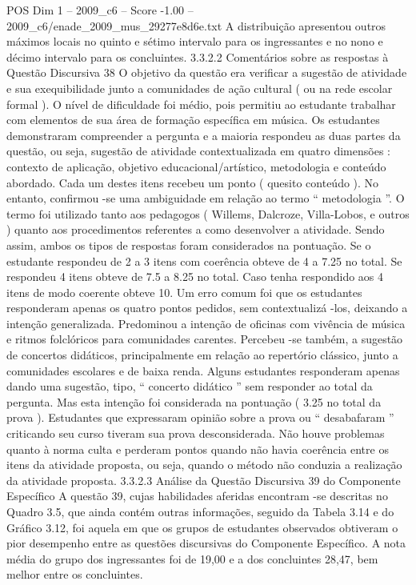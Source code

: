 \begin{textsample}{POS Dim 1 – 2009\_c6 – Score -1.00 – 2009\_c6/enade\_2009\_mus\_29277e8d6e.txt}
A distribuição apresentou outros máximos locais no quinto e sétimo intervalo para os ingressantes e no nono e décimo intervalo para os concluintes. 3.3.2.2 Comentários sobre as respostas à Questão Discursiva 38 O objetivo da questão era verificar a sugestão de atividade e sua exequibilidade junto a comunidades de ação cultural ( ou na rede escolar formal ).
O nível de dificuldade foi médio, pois permitiu ao estudante trabalhar com elementos de sua área de formação específica em música.
Os estudantes demonstraram compreender a pergunta e a maioria respondeu as duas partes da questão, ou seja, sugestão de atividade contextualizada em quatro dimensões : contexto de aplicação, objetivo educacional/artístico, metodologia e conteúdo abordado.
Cada um destes itens recebeu um ponto ( quesito conteúdo ).
No entanto, confirmou -se uma ambiguidade em relação ao termo “ metodologia ”.
O termo foi utilizado tanto aos pedagogos ( Willems, Dalcroze, Villa-Lobos, e outros ) quanto aos procedimentos referentes a como desenvolver a atividade.
Sendo assim, ambos os tipos de respostas foram considerados na pontuação.
Se o estudante respondeu de 2 a 3 itens com coerência obteve de 4 a 7.25 no total.
Se respondeu 4 itens obteve de 7.5 a 8.25 no total.
Caso tenha respondido aos 4 itens de modo coerente obteve 10.
Um erro comum foi que os estudantes responderam apenas os quatro pontos pedidos, sem contextualizá -los, deixando a intenção generalizada.
Predominou a intenção de oficinas com vivência de música e ritmos folclóricos para comunidades carentes.
Percebeu -se também, a sugestão de concertos didáticos, principalmente em relação ao repertório clássico, junto a comunidades escolares e de baixa renda.
Alguns estudantes responderam apenas dando uma sugestão, tipo, “ concerto didático ” sem responder ao total da pergunta.
Mas esta intenção foi considerada na pontuação ( 3.25 no total da prova ).
Estudantes que expressaram opinião sobre a prova ou “ desabafaram ” criticando seu curso tiveram sua prova desconsiderada.
Não houve problemas quanto à norma culta e perderam pontos quando não havia coerência entre os itens da atividade proposta, ou seja, quando o método não conduzia a realização da atividade proposta. 3.3.2.3 Análise da Questão Discursiva 39 do Componente Específico A questão 39, cujas habilidades aferidas encontram -se descritas no Quadro 3.5, que ainda contém outras informações, seguido da Tabela 3.14 e do Gráfico 3.12, foi aquela em que os grupos de estudantes observados obtiveram o pior desempenho entre as questões discursivas do Componente Específico.
A nota média do grupo dos ingressantes foi de 19,00 e a dos concluintes 28,47, bem melhor entre os concluintes.

\end{textsample}
